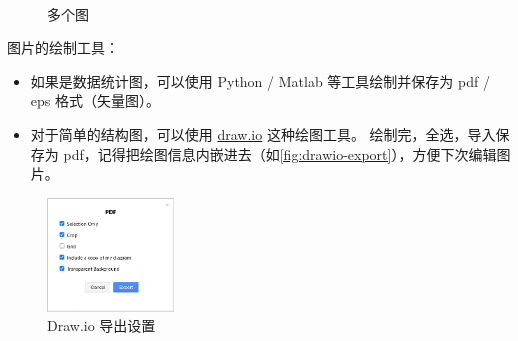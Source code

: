 \begin{figure}[H]
    \centering
    \\
    \caption{多个图}
    \label{fig:subfigure}
\end{figure}

图片的绘制工具：

\begin{itemize}
    \item 如果是数据统计图，可以使用 Python / Matlab 等工具绘制并保存为 pdf / eps 格式（矢量图）。
    \item 对于简单的结构图，可以使用 \href{https://www.diagrams.net/}{draw.io} 这种绘图工具。
    绘制完，全选，导入保存为 pdf，记得把绘图信息内嵌进去（如\autoref{fig:drawio-export}），方便下次编辑图片。
\end{itemize}

\begin{figure}[H]
    \centering
    \caption{Draw.io 导出设置}
    \label{fig:drawio-export}
    \includegraphics[width=0.3\textwidth]{img/drawio-export.png}
\end{figure}

